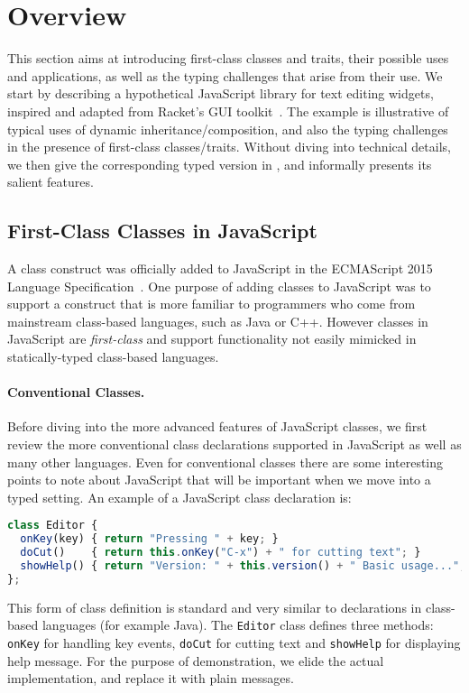 
\section{Overview}
\label{sec:overview}

This section aims at introducing first-class classes and traits, their possible
uses and applications, as well as the typing challenges that arise
from their use.
We start by describing a hypothetical JavaScript library for text editing
widgets, inspired and adapted from Racket's GUI
toolkit~\cite{DBLP:conf/oopsla/TakikawaSDTF12}. The example is illustrative of
typical uses of dynamic inheritance/composition, and also the typing challenges
in the presence of first-class classes/traits. Without diving into
technical details, we then give the corresponding typed version in
\name, and informally presents its salient features.

\subsection{First-Class Classes in JavaScript}

A class construct was officially added to JavaScript in the ECMAScript
2015 Language Specification~\cite{EcmaScript:15}. One purpose of
adding classes to JavaScript was to support a construct that is more
familiar to programmers who come from mainstream class-based languages,
such as Java or C++. However classes in JavaScript are
\emph{first-class} and support functionality not easily mimicked in
statically-typed class-based languages.

\paragraph{Conventional Classes.}
Before diving into the more advanced features of JavaScript classes, we first
review the more conventional class declarations supported in JavaScript as well
as many other languages. Even for conventional classes there are some
interesting points to note about JavaScript that will be important when we move
into a typed setting. An example of a JavaScript class declaration is:
\begin{lstlisting}[language=JavaScript]
class Editor {
  onKey(key) { return "Pressing " + key; }
  doCut()    { return this.onKey("C-x") + " for cutting text"; }
  showHelp() { return "Version: " + this.version() + " Basic usage..."; }
};
\end{lstlisting}
This form of class definition is standard and very similar to declarations in
class-based languages (for example Java). The \lstinline{Editor} class
defines three methods: \lstinline{onKey} for handling key events,
\lstinline{doCut} for cutting text and \lstinline{showHelp} for displaying help
message. For the purpose of demonstration, we elide the actual implementation,
and replace it with plain messages.

